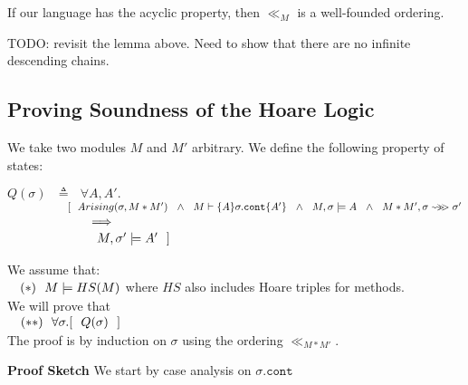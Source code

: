 \begin{lemma}
If our language has the acyclic property, then $\ll_M$ is a well-founded ordering.
\end{lemma}

TODO: revisit the lemma above. Need to show that there are no infinite descending chains.

\subsection{Proving Soundness of the Hoare Logic}

We take two modules $M$ and $M'$ arbitrary. We define the following property of states:

$Q(\sigma)\ \ \ \triangleq\  \ \ \forall A, A'. $\\
$\strut \hspace{2cm} [ \  \ Arising(\sigma,M*M') \ \  \wedge\ \ 
M \vdash \{A \} \sigma.\texttt{cont} \{A' \} \ \ \wedge\ \  M, \sigma \models  A \ \ 
\wedge\ \  \leadstoFin  {M*M'}{\sigma}  {\sigma'}$\\
$\strut \hspace{2cm}   \ \  \Longrightarrow$\\
$\strut \hspace{2cm} \ \   \ \ M, \sigma' \models  A'  \  \ ]$

\noindent
We assume that: \\
$\strut \ \ \ (*) \ \ M \models HS(M)$
where $HS$ also includes Hoare triples for methods.\\
We will prove that \\
$\strut \ \ \ (**) \ \ \forall \sigma.[  \ \ Q(\sigma)\ \ ]$
\\
The proof is by induction on $\sigma$ using the ordering $\ll_{M*M'}$. 

\noindent
\vspace{.2cm}
  {\textbf{Proof Sketch}} 
We start by case analysis on $\sigma.\texttt{cont}$ 

